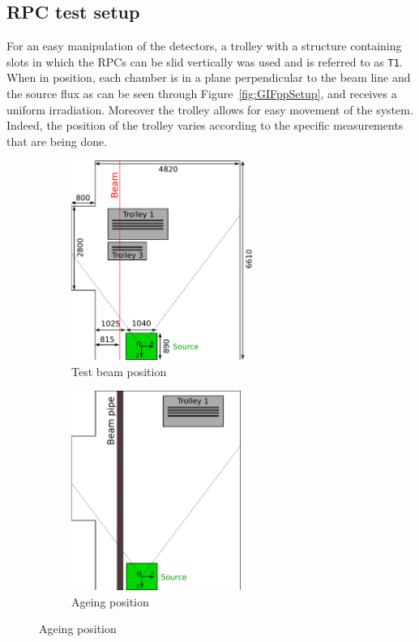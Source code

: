 	\subsection{RPC test setup}
	\label{chapt5:ssec:GIFppSetup}
	
	For an easy manipulation of the detectors, a trolley with a structure containing slots in which the RPCs can be slid vertically was used and is referred to as \texttt{T1}. When in position, each chamber is in a plane perpendicular to the beam line and the source flux as can be seen through Figure~\ref{fig:GIFppSetup}, and receives a uniform irradiation. Moreover the trolley allows for easy movement of the system. Indeed, the position of the trolley varies according to the specific measurements that are being done.
	
	\begin{figure}[H]
    	\begin{subfigure}{0.5\linewidth}
			\centering
    		\includegraphics[height = 65mm]{fig/chapt5/GIFpp-Setup-A.pdf}
        	\caption{\label{fig:GIFppSetup:A} Test beam position}
    	\end{subfigure}
    	\begin{subfigure}{0.5\linewidth}
			\centering
    		\includegraphics[height = 65mm]{fig/chapt5/GIFpp-Setup-B.pdf}
        	\caption{\label{fig:GIFppSetup:B} Ageing position}

\end{subfigure}
\end{figure}
